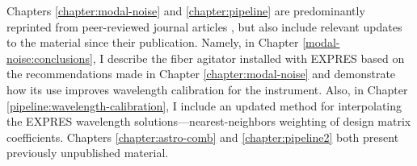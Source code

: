 Chapters \ref{chapter:modal-noise} and \ref{chapter:pipeline} are predominantly reprinted from peer-reviewed journal articles \citep{petersburg_modal_2018, petersburg_extreme-precision_2020}, but also include relevant updates to the material since their publication. Namely, in Chapter \ref{modal-noise:conclusions}, I describe the fiber agitator installed with EXPRES based on the recommendations made in Chapter \ref{chapter:modal-noise} and demonstrate how its use improves wavelength calibration for the instrument. Also, in Chapter \ref{pipeline:wavelength-calibration}, I include an updated method for interpolating the EXPRES wavelength solutions---nearest-neighbors weighting of design matrix coefficients. Chapters \ref{chapter:astro-comb} and \ref{chapter:pipeline2} both present previously unpublished material.
